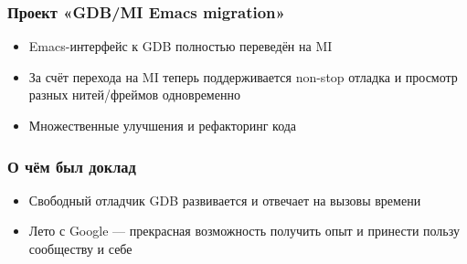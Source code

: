 \documentclass[onlymath]{beamer}
\begin{document}
\begin{frame}
  \frametitle{Проект «GDB/MI Emacs migration»}
  \begin{itemize}
  \item Emacs-интерфейс к GDB полностью переведён на MI
  \item За счёт перехода на MI теперь поддерживается non-stop отладка
    и просмотр разных нитей/фреймов одновременно
  \item Множественные улучшения и рефакторинг кода
  \end{itemize}
\end{frame}
\appendix
\begin{frame}
  \frametitle{О чём был доклад}
  \begin{itemize}
  \item Свободный отладчик GDB развивается и отвечает на вызовы
    времени
  \item Лето с Google — прекрасная возможность получить опыт и
    принести пользу сообществу и себе
  \end{itemize}
\end{frame}
\end{document}

